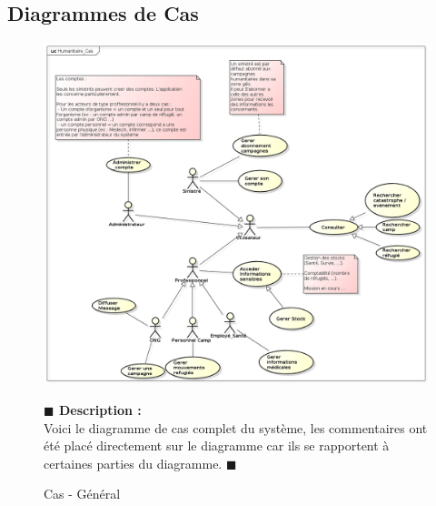 \documentclass[11pt, titlepage]{report}
\newcommand{\debutDescription}{\noindent\textbf{\textcolor{DescriptionColor}{$\blacksquare$  Description : \\}}}
\newcommand{\finDescription}{\noindent\textcolor{DescriptionColor}{$\blacksquare$}}
\begin{document}
\subsection{Diagrammes de Cas}
\begin{figure}[h!]
\begin{center}
 \includegraphics[scale=.4]{../images/diagrammes/uml/complementaire/cas_general.png} 
\caption{Cas - Général}
\end{center}
\debutDescription
Voici le diagramme de cas complet du système, les commentaires ont été placé directement sur le diagramme car ils se rapportent à certaines parties du diagramme.
\finDescription
\end{figure}

\clearpage
\end{document}
